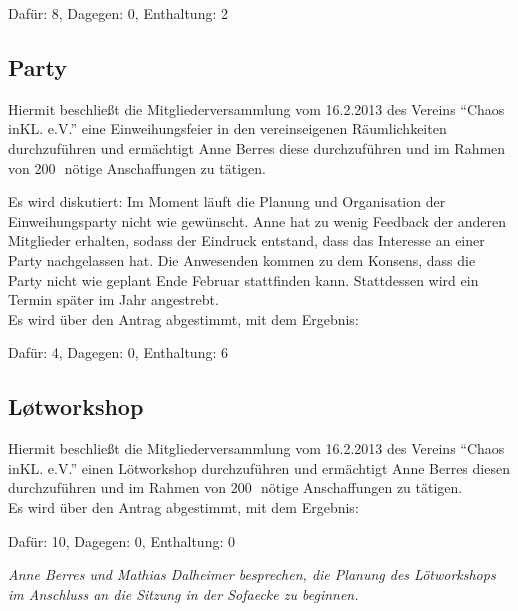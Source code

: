\documentclass{scrartcl}
\begin{document}
Dafür: 8, Dagegen: 0, Enthaltung: 2

\subsection*{Party}

Hiermit beschließt die Mitgliederversammlung vom 16.2.2013 des
Vereins ``Chaos inKL. e.V.'' eine Einweihungsfeier in den
vereinseigenen Räumlichkeiten durchzuführen und ermächtigt Anne
Berres diese durchzuführen und im Rahmen von 200\officialeuro\,\, nötige
Anschaffungen zu tätigen.

Es wird diskutiert:
Im Moment läuft die Planung und Organisation der Einweihungsparty nicht wie gewünscht.
Anne hat zu wenig Feedback der anderen Mitglieder erhalten, sodass der Eindruck entstand, dass das Interesse an einer Party nachgelassen hat.
Die Anwesenden kommen zu dem Konsens, dass die Party nicht wie geplant Ende Februar stattfinden kann.
Stattdessen wird ein Termin später im Jahr angestrebt.\\

Es wird über den Antrag abgestimmt, mit dem Ergebnis: 

Dafür: 4, Dagegen: 0, Enthaltung: 6

\subsection*{Løtworkshop}

Hiermit beschließt die Mitgliederversammlung vom 16.2.2013 des
Vereins ``Chaos inKL. e.V.'' einen Lötworkshop durchzuführen und
ermächtigt Anne Berres diesen durchzuführen und im Rahmen von 200\officialeuro\,\,
nötige Anschaffungen zu tätigen.\\

Es wird über den Antrag abgestimmt, mit dem Ergebnis: 

Dafür: 10, Dagegen: 0, Enthaltung: 0

\emph{Anne Berres und Mathias Dalheimer besprechen, die Planung des Lötworkshops im Anschluss an die Sitzung in der Sofaecke zu beginnen.}
\end{document}

